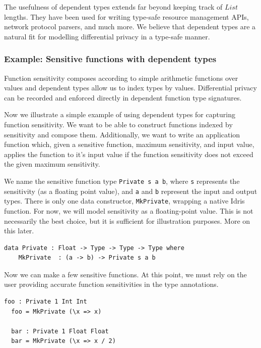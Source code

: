\documentclass[12pt]{article}
\begin{document}
The usefulness of dependent types extends far beyond keeping track of $List$ lengths.
They have been used for writing type-safe resource management APIs, network protocol parsers, and much more\cite{conf/plpv/Brady11}.
We believe that dependent types are a natural fit for modelling differential privacy in a type-safe manner.

\subsubsection{Example: Sensitive functions with dependent types}

Function sensitivity composes according to simple arithmetic functions over values and dependent types allow us to index types by values.
Differential privacy can be recorded and enforced directly in dependent function type signatures.

Now we illustrate a simple example of using dependent types for capturing function sensitivity.
We want to be able to construct functions indexed by sensitivity and compose them.
Additionally, we want to write an application function which, given a sensitive function, maximum sensitivity, and input value, applies the function to it's input value if the function sensitivity does not exceed the given maximum sensitivity.

We name the sensitive function type \texttt{Private s a b}, where \texttt{s} represents the sensitivity (as a floating point value), and \texttt{a} and \texttt{b} represent the input and output types.
There is only one data constructor, \texttt{MkPrivate}, wrapping a native Idris function.
For now, we will model sensitivity as a floating-point value.
This is not necessarily the best choice, but it is sufficient for illustration purposes.
More on this later.

\begin{lstlisting}[caption="Sensitive functions in Idris"]
  data Private : Float -> Type -> Type -> Type where
    MkPrivate  : (a -> b) -> Private s a b
\end{lstlisting}

Now we can make a few sensitive functions.
At this point, we must rely on the user providing accurate function sensitivities in the type annotations.

\begin{lstlisting}[caption="Simple examples of sensitive functions"]
  foo : Private 1 Int Int
  foo = MkPrivate (\x => x)

  bar : Private 1 Float Float
  bar = MkPrivate (\x => x / 2)
\end{lstlisting}
\end{document}
